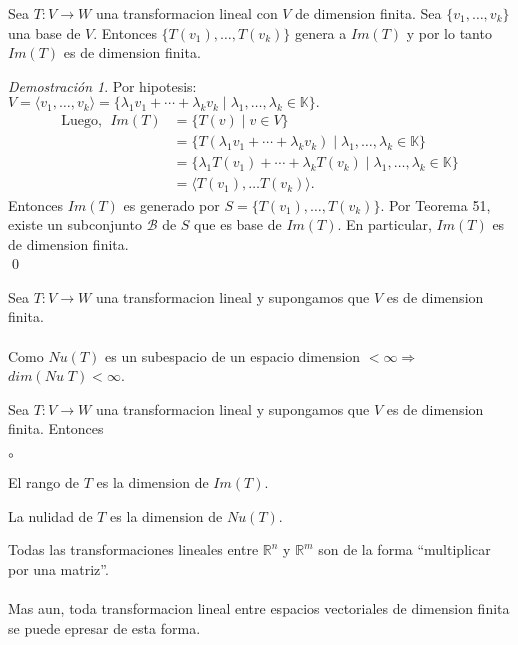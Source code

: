 \documentclass{article}
\theoremstyle{definition}
\theoremstyle{definition}
\theoremstyle{remark}
\newtheorem*{demo}{Demostración}
\begin{document}
\begin{lema}
  Sea $T: V \to W$ una transformacion lineal con $V$ de dimension finita. Sea $\{v_1, \dots ,v_k\}$ una base de $V$. Entonces $\{T(v_1), \dots ,T(v_k)\}$ genera a $Im(T)$ y por lo tanto $Im(T)$ es de dimension finita.
\end{lema}
\begin{demo}
  Por hipotesis: $V=\langle v_1, \dots ,v_k \rangle =\{\lambda_1 v_1 + \cdots + \lambda_k v_k \; | \; \lambda_1, \dots , \lambda_k \in \mathbb{K}\}.$ \[
    \begin{aligned}
      \text{Luego, }\; Im(T) &= \{T(v) \; | \; v \in V\} \\
                           &= \{T(\lambda_1 v_1 + \cdots + \lambda_k v_k) \; | \; \lambda_1, \dots, \lambda_k \in \mathbb{K}\} \\
                           &=\{\lambda_1 T(v_1)+\cdots + \lambda_k T(v_k) \; | \; \lambda_1, \dots ,\lambda_k \in \mathbb{K}\} \\
                           &= \langle T(v_1), \dots T(v_k)\rangle.
    \end{aligned}
  \]
  Entonces $Im(T)$ es generado por $S=\{T(v_1), \dots , T(v_k)\}$. Por Teorema 51, existe un subconjunto $\mathcal{B}$ de $S$ que es base de $Im(T)$. En particular, $Im(T)$ es de dimension finita. \\ \qed 
\end{demo}
Sea $T: V \to W$ una transformacion lineal y supongamos que $V$ es de dimension finita.  \\\\
Como $Nu(T)$ es un subespacio de un espacio dimension $< \infty \Rightarrow $ \\ $dim(Nu\; T) < \infty$. 
\begin{defi}
  Sea $T : V \to W$ una transformacion lineal y supongamos que $V$ es de dimension finita. Entonces 
  \begin{list}{$\circ$}{}  
\item El rango de $T$ es la dimension de $Im(T)$.
\item La nulidad de $T$ es la dimension de $Nu(T)$.
\end{list}
\end{defi}
Todas las transformaciones lineales entre $\mathbb{R}^n$ y $\mathbb{R}^m$ son de la forma ``multiplicar por una matriz''.\\\\ Mas aun, toda transformacion lineal entre espacios vectoriales de dimension finita se puede epresar de esta forma. \\\\
\end{document}

